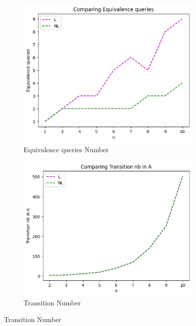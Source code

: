 \begin{figure}[!htb]
  \begin{subfigure}[b]{0.3\textwidth}
    \includegraphics[width=\textwidth]{../statistics/plots/wrostRFSA/Equivalence queries.png}
    \caption{Equivalence queries Number}
    \label{fig:EquivWrostRFSACompare}
  \end{subfigure}
  \begin{subfigure}[b]{0.3\textwidth}
    \includegraphics[width=\textwidth]{../statistics/plots/wrostRFSA/Transition nb in A.png}
    \caption{Transition Number}
    \label{fig:TransitionWrostRFSACompare}
  \end{subfigure}

\end{figure}
